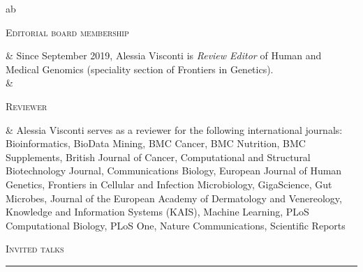 \documentclass[a4paper,10pt]{article}
\newcommand{\mediumtitle}[1]{
	\vspace{0.2cm}
	{\noindent
	\Large \textsc{#1}\\[-2ex]
	\hrule
	\vspace{0.2cm}}
}
\newenvironment{singletablelist}
{	\vspace{-0.2cm}
	\begin{longtable}[!h]{ab}}{\end{longtable}
}
\newcommand{\stlist}[2]{
	\hspace{-3cm}
	\noindent
	\begin{minipage}{0.24\textwidth}
	\begin{flushright}
	\textsc{#1}
	\end{flushright}
	\end{minipage}
	& #2\\[0.2cm]
}
\begin{document}
\begin{singletablelist}
\stlist{Editorial board membership}{ Since September 2019, Alessia Visconti is \emph{Review Editor} of Human and Medical Genomics (speciality section of Frontiers in Genetics).\\ &}
\stlist{Reviewer}{ Alessia Visconti serves as a reviewer for the following international journals: Bioinformatics, BioData Mining, BMC Cancer, BMC Nutrition, BMC Supplements, British Journal of Cancer, Computational and Structural Biotechnology Journal, Communications Biology, European Journal of Human Genetics, Frontiers in Cellular and Infection Microbiology, GigaScience, Gut Microbes, Journal of the European Academy of Dermatology and Venereology, Knowledge and Information Systems (KAIS), Machine Learning, PLoS Computational Biology, PLoS One, Nature Communications, Scientific Reports
}
\end{singletablelist}



\mediumtitle{Invited talks}
\end{document}
